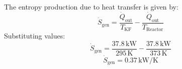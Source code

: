 The entropy production due to heat transfer is given by:  
\[
\dot{S}_{\text{gen}} = \frac{\dot{Q}_{\text{out}}}{T_{\text{KF}}} - \frac{\dot{Q}_{\text{out}}}{T_{\text{Reactor}}}
\]  
Substituting values:  
\[
\dot{S}_{\text{gen}} = \frac{37.8 \, \text{kW}}{295 \, \text{K}} - \frac{37.8 \, \text{kW}}{373 \, \text{K}}
\]  
\[
\dot{S}_{\text{gen}} = 0.37 \, \text{kW/K}
\]
